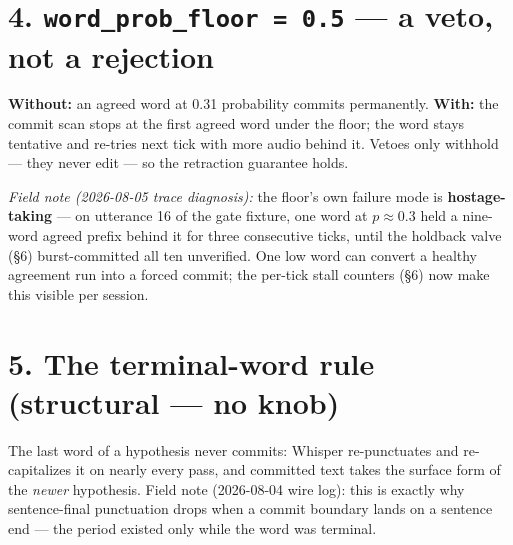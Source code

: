 \documentclass[11pt]{article}
\newcommand{\panelrow}[1]{\node[rowlbl] at (-0.2,0.25) {#1};}
\begin{document}
\section*{4. \texttt{word\_prob\_floor = 0.5} --- a veto, not a rejection}

\textbf{Without:} an agreed word at 0.31 probability commits permanently.
\textbf{With:} the commit scan stops at the first agreed word under the floor;
the word stays tentative and re-tries next tick with more audio behind it.
Vetoes only withhold --- they never edit --- so the retraction guarantee holds.

\emph{Field note (2026-08-05 trace diagnosis):} the floor's own failure mode is
\textbf{hostage-taking} --- on utterance 16 of the gate fixture, one word at
$p \approx 0.3$ held a nine-word agreed prefix behind it for three consecutive
ticks, until the holdback valve (\S6) burst-committed all ten unverified. One
low word can convert a healthy agreement run into a forced commit; the
per-tick stall counters (\S6) now make this visible per session.

\begin{center}
\end{center}

\section*{5. The terminal-word rule (structural --- no knob)}

The last word of a hypothesis never commits: Whisper re-punctuates and
re-capitalizes it on nearly every pass, and committed text takes the surface
form of the \emph{newer} hypothesis. Field note (2026-08-04 wire log): this is
exactly why sentence-final punctuation drops when a commit boundary lands on a
sentence end --- the period existed only while the word was terminal.
\end{document}
